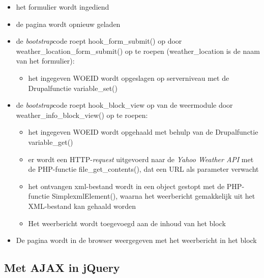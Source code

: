 \begin{itemize}
	\item het formulier wordt ingediend
	\item de pagina wordt opnieuw geladen
	\item de \textit{bootstrap}code roept hook\_form\_submit() op door weather\_location\_form\_submit() op te roepen (weather\_location is de naam van het formulier):
	\begin{itemize}
		\item het ingegeven WOEID wordt opgeslagen op serverniveau met de Drupalfunctie variable\_set()
	\end{itemize}
	\item de \textit{bootstrap}code roept hook\_block\_view op van de weermodule door weather\_info\_block\_view() op te roepen:
	\begin{itemize}
		\item het ingegeven WOEID wordt opgehaald met behulp van de Drupalfunctie variable\_get()
		\item er wordt een HTTP-\textit{request} uitgevoerd naar de \textit{Yahoo Weather API} met de PHP-functie file\_get\_contents(), dat een URL als parameter verwacht
		\item het ontvangen xml-bestand wordt in een object gestopt met de PHP-functie SimplexmlElement(), waarna het weerbericht gemakkelijk uit het XML-bestand kan gehaald worden
		\item Het weerbericht wordt toegevoegd aan de inhoud van het block
	\end{itemize}
	\item De pagina wordt in de browser weergegeven met het weerbericht in het block
\end{itemize}

\subsection{Met AJAX in jQuery}

